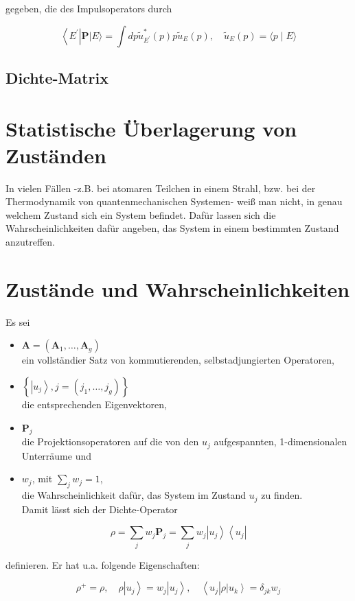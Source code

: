 \documentclass[10pt, letterpaper]{article}
\begin{document}
gegeben, die des Impulsoperators durch

$$
\left\langle E^{\prime}\right| \mathbf{P}|E\rangle=\int d p \tilde{u}_{E^{\prime}}^{*}(p) p \tilde{u}_{E}(p), \quad \tilde{u}_{E}(p)=\langle p \mid E\rangle
$$

\subsection*{Dichte-Matrix}
\section*{Statistische Überlagerung von Zuständen}
In vielen Fällen -z.B. bei atomaren Teilchen in einem Strahl, bzw. bei der Thermodynamik von quantenmechanischen Systemen- weiß man nicht, in genau welchem Zustand sich ein System befindet. Dafür lassen sich die Wahrscheinlichkeiten dafür angeben, das System in einem bestimmten Zustand anzutreffen.

\section*{Zustände und Wahrscheinlichkeiten}
Es sei

\begin{itemize}
  \item $\mathbf{A}=\left(\mathbf{A}_{1}, \ldots, \mathbf{A}_{g}\right)$\\
ein vollständier Satz von kommutierenden, selbstadjungierten Operatoren,
  \item $\left\{\left|u_{j}\right\rangle, j=\left(j_{1}, \ldots, j_{g}\right)\right\}$\\
die entsprechenden Eigenvektoren,
  \item $\mathbf{P}_{j}$\\
die Projektionsoperatoren auf die von den $u_{j}$ aufgespannten, 1-dimensionalen Unterräume und
  \item $w_{j}$, mit $\sum_{j} w_{j}=1$,\\
die Wahrscheinlichkeit dafür, das System im Zustand $u_{j}$ zu finden.\\
Damit lässt sich der Dichte-Operator
\end{itemize}

$$
\rho=\sum_{j} w_{j} \mathbf{P}_{j}=\sum_{j} w_{j}\left|u_{j}\right\rangle\left\langle u_{j}\right|
$$

definieren. Er hat u.a. folgende Eigenschaften:

$$
\rho^{+}=\rho, \quad \rho\left|u_{j}\right\rangle=w_{j}\left|u_{j}\right\rangle, \quad\left\langle u_{j}\right| \rho\left|u_{k}\right\rangle=\delta_{j k} w_{j}
$$
\end{document}
